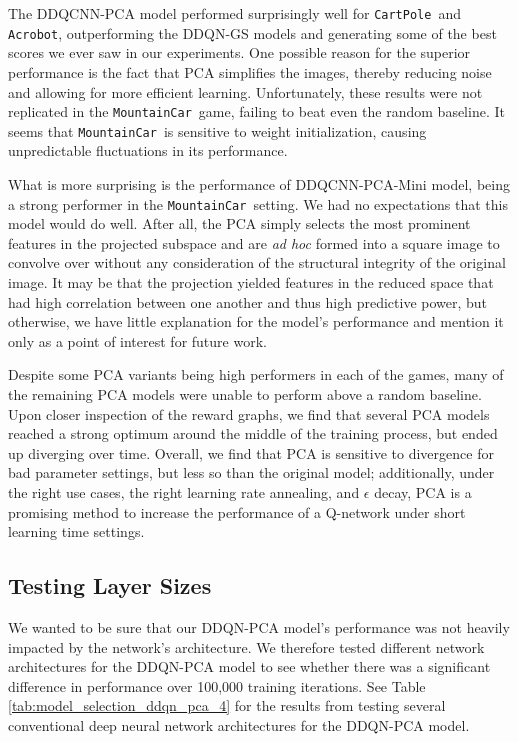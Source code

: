 \documentclass[11pt]{article}
\newcommand{\cp}{\texttt{CartPole}}
\newcommand{\ab}{\texttt{Acrobot}}
\newcommand{\mc}{\texttt{MountainCar}}
\begin{document}
The DDQCNN-PCA model performed surprisingly well for \cp~and \ab, outperforming the DDQN-GS models and generating some of the best scores we ever saw in our experiments. One possible reason for the superior performance is the fact that PCA simplifies the images, thereby reducing noise and allowing for more efficient learning. Unfortunately, these results were not replicated in the \mc~game, failing to beat even the random baseline. It seems that \mc~is sensitive to weight initialization, causing unpredictable fluctuations in its performance.

What is more surprising is the performance of DDQCNN-PCA-Mini model, being a strong performer in the \mc~setting. We had no expectations that this model would do well. After all, the PCA simply selects the most prominent features in the projected subspace and are \textit{ad hoc} formed into a square image to convolve over without any consideration of the structural integrity of the original image. It may be that the projection yielded features in the reduced space that had high correlation between one another and thus high predictive power, but otherwise, we have little explanation for the model's performance and mention it only as a point of interest for future work. 

Despite some PCA variants being high performers in each of the games, many of the remaining PCA models were unable to perform above a random baseline. Upon closer inspection of the reward graphs, we find that several PCA models reached a strong optimum around the middle of the training process, but ended up diverging over time. Overall, we find that PCA is sensitive to divergence for bad parameter settings, but less so than the original model; additionally, under the right use cases, the right learning rate annealing, and $\epsilon$ decay, PCA is a promising method to increase the performance of a Q-network under short learning time settings.

\subsection{Testing Layer Sizes}

We wanted to be sure that our DDQN-PCA model's performance was not heavily impacted by the network's architecture. We therefore tested different network architectures for the DDQN-PCA model to see whether there was a significant difference in performance over 100,000 training iterations. See Table \ref{tab:model_selection_ddqn_pca_4} for the results from testing several conventional deep neural network architectures for the DDQN-PCA model.
\end{document}
